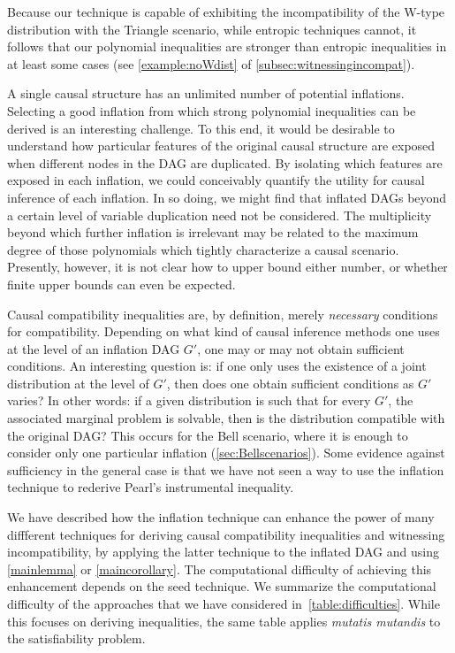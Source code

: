 \documentclass[aps,english,superscriptaddress,onecolumn,twoside,longbibliography,pra,floatfix,fleqn,nofootinbib]{revtex4-1}%
\theoremstyle{definition}
\begin{document}
Because our technique is capable of exhibiting the incompatibility of the W-type distribution with the Triangle scenario, while entropic techniques cannot, it follows that our polynomial inequalities are stronger than entropic inequalities in at least some cases (see \cref{example:noWdist} of \cref{subsec:witnessingincompat}).   

A single causal structure has an unlimited number of potential inflations. Selecting a good inflation from which strong polynomial inequalities can be derived is an interesting challenge. To this end, it would be desirable to understand how particular features of the original causal structure are exposed when different nodes in the DAG are duplicated. By isolating which features are exposed in each inflation, we could conceivably quantify the utility for causal inference of each inflation. In so doing, we might find that inflated DAGs beyond a certain level of variable duplication need not be considered. The multiplicity beyond which further inflation is irrelevant may be related to the maximum degree of those polynomials which tightly characterize a causal scenario. Presently, however, it is not clear how to upper bound either number, or whether finite upper bounds can even be expected.


Causal compatibility inequalities are, by definition, merely {\em necessary} conditions for compatibility. Depending on what kind of causal inference methods one uses at the level of an inflation DAG $G'$, one may or may not obtain sufficient conditions. An interesting question is: if one only uses the existence of a joint distribution at the level of $G'$, then does one obtain sufficient conditions as $G'$ varies? In other words: if a given distribution is such that for every $G'$, the associated marginal problem is solvable, then is the distribution compatible with the original DAG? This occurs for the Bell scenario, where it is enough to consider only one particular inflation (\cref{sec:Bellscenarios}). Some evidence against sufficiency in the general case is that we have not seen a way to use the inflation technique to rederive Pearl's instrumental inequality.

We have described how the inflation technique can enhance the power of many diffferent techniques for deriving causal compatibility inequalities and witnessing incompatibility, by applying the latter technique to the inflated DAG and using \cref{mainlemma} or \cref{maincorollary}.  The computational difficulty of achieving this enhancement depends on the seed technique.  We summarize the computational difficulty of the approaches that we have considered in~\cref{table:difficulties}. While this focuses on deriving inequalities, the same table applies \emph{mutatis mutandis} to the satisfiability problem. 
\end{document}
